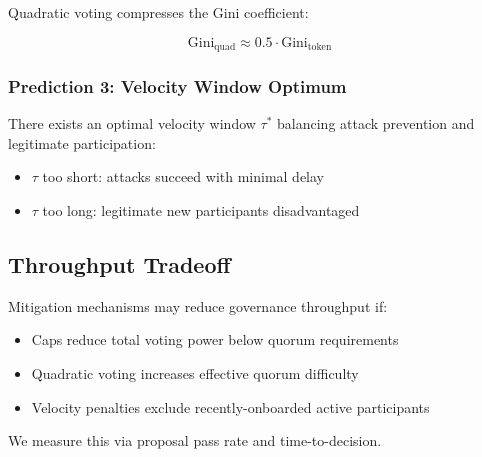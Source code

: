 Quadratic voting compresses the Gini coefficient:

\begin{equation}
\text{Gini}_{\text{quad}} \approx 0.5 \cdot \text{Gini}_{\text{token}}
\end{equation}

\subsubsection{Prediction 3: Velocity Window Optimum}

There exists an optimal velocity window $\tau^*$ balancing attack prevention and legitimate participation:
\begin{itemize}
    \item $\tau$ too short: attacks succeed with minimal delay
    \item $\tau$ too long: legitimate new participants disadvantaged
\end{itemize}

\subsection{Throughput Tradeoff}

Mitigation mechanisms may reduce governance throughput if:
\begin{itemize}
    \item Caps reduce total voting power below quorum requirements
    \item Quadratic voting increases effective quorum difficulty
    \item Velocity penalties exclude recently-onboarded active participants
\end{itemize}

We measure this via proposal pass rate and time-to-decision.
